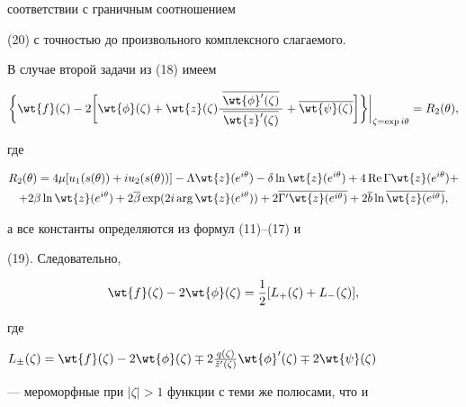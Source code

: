 соответствии с граничным соотношением


(20) с точностью до произвольного комплексного слагаемого.





В случае второй задачи из (18) имеем


$$


\bigg\{\wt{f}(\zeta) - 2\bigg[\wt{\phi}(\zeta) +


\wt{z}(\zeta)\frac{\;\overline{\wt{\phi}'(\zeta)}\;}{\overline{\wt{z}'(\zeta)}}


+ \overline{\wt{\psi}(\zeta)}\bigg]\bigg\}\bigg|_{\zeta = \exp i\theta} =


R_2(\theta),


$$


где


\begin{gather*}


R_2(\theta) = 4\mu[u_1(s(\theta)) + i u_2(s(\theta))] -


\Lambda \wt{z}(e^{i\theta}) - \delta \ln


\wt{z}(e^{i\theta}) + 4 \re \Gamma \wt{z}(e^{i\theta}) +\\


+ 2\beta \ln \wt{z}(e^{i\theta}) + 2\overline{\beta} \exp


(2i \arg \wt{z}(e^{i\theta})) + 2\overline{\Gamma'


\wt{z}(e^{i\theta})} + 2 \overline{b} \ln


\overline{\wt{z}(e^{i\theta})},


\end{gather*}


а все константы определяются из формул (11)--(17) и


(19). Следовательно,


\begin{equation}


\wt{f}(\zeta) - 2 \wt{\phi}(\zeta) = \frac{1}{2} [L_+


(\zeta) + L_- (\zeta)], 


\end{equation}


где


$L_{\pm}(\zeta) = \wt{f}(\zeta) - 2 \wt{\phi}(\zeta) \mp 2


\frac{q(\zeta)}{\Tilde{z}'(\zeta)} \wt{\phi}'(\zeta) \mp


2\wt{\psi}(\zeta)$


--- мероморфные при $|\zeta| > 1$ функции с теми же полюсами, что и


